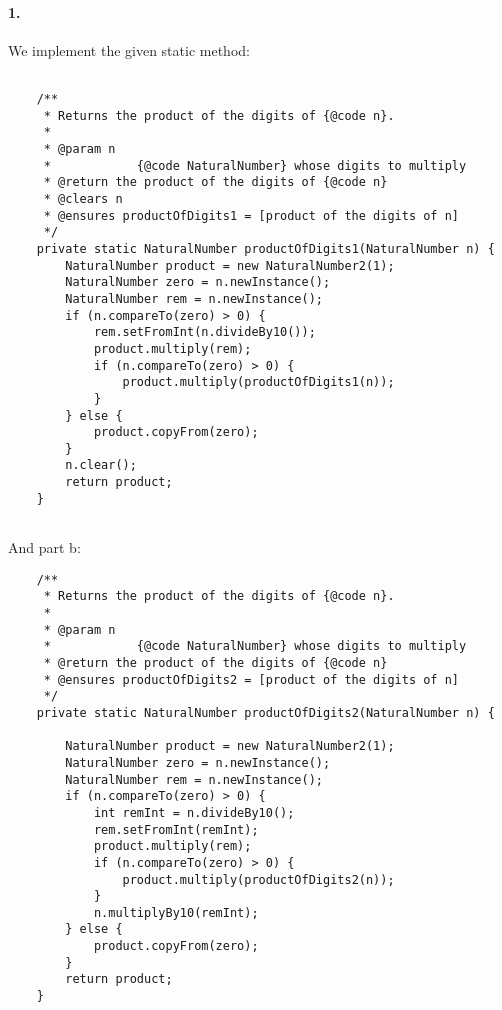\documentclass[10pt]{article}
\begin{document}
\maketitle

\paragraph{1. } We implement the given static method: 
\begin{lstlisting} 

    /**
     * Returns the product of the digits of {@code n}.
     *
     * @param n
     *            {@code NaturalNumber} whose digits to multiply
     * @return the product of the digits of {@code n}
     * @clears n
     * @ensures productOfDigits1 = [product of the digits of n]
     */
    private static NaturalNumber productOfDigits1(NaturalNumber n) {
        NaturalNumber product = new NaturalNumber2(1);
        NaturalNumber zero = n.newInstance();
        NaturalNumber rem = n.newInstance();
        if (n.compareTo(zero) > 0) {
            rem.setFromInt(n.divideBy10());
            product.multiply(rem);
            if (n.compareTo(zero) > 0) {
                product.multiply(productOfDigits1(n));
            }
        } else {
            product.copyFrom(zero);
        }
        n.clear();
        return product;
    }
   

\end{lstlisting}
\vspace{30mm}
And part b: 
\begin{lstlisting}
	/**
     * Returns the product of the digits of {@code n}.
     *
     * @param n
     *            {@code NaturalNumber} whose digits to multiply
     * @return the product of the digits of {@code n}
     * @ensures productOfDigits2 = [product of the digits of n]
     */
    private static NaturalNumber productOfDigits2(NaturalNumber n) {

        NaturalNumber product = new NaturalNumber2(1);
        NaturalNumber zero = n.newInstance();
        NaturalNumber rem = n.newInstance();
        if (n.compareTo(zero) > 0) {
            int remInt = n.divideBy10();
            rem.setFromInt(remInt);
            product.multiply(rem);
            if (n.compareTo(zero) > 0) {
                product.multiply(productOfDigits2(n));
            }
            n.multiplyBy10(remInt);
        } else {
            product.copyFrom(zero);
        }
        return product;
    }
\end{lstlisting}
\end{document}
